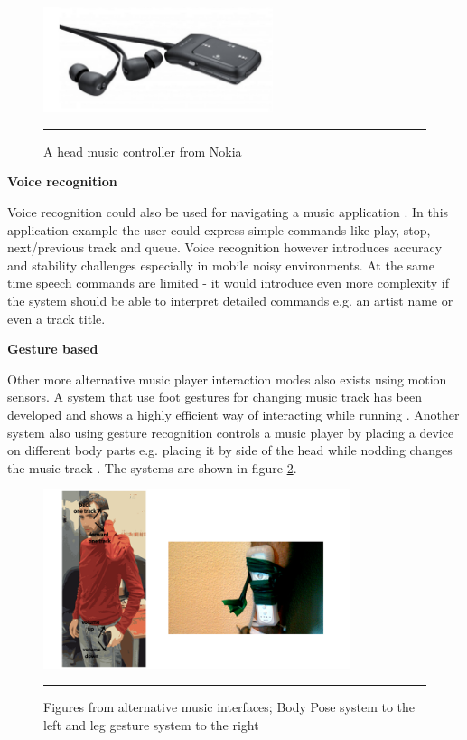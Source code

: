 \begin{figure}[t]
	\centering
		\includegraphics[width=0.6\textwidth,height=\textheight,keepaspectratio]{./Figures/nokia-headset.png}
		\rule{35em}{0.5pt}
	\caption[Nokia music headset]{A head music controller from Nokia \cite{nokia_launch:_2011}}
	\label{fig:nokia}
\end{figure}

\textbf{Voice recognition}

Voice recognition could also be used for navigating a music application \cite{stewart_boling_voice_2013}. In this application example the user could express simple commands like play, stop, next/previous track and queue. Voice recognition however introduces accuracy and stability challenges especially in mobile noisy environments. At the same time speech commands are limited - it would introduce even more complexity if the system should be able to interpret detailed commands e.g. an artist name or even a track title.


\textbf{Gesture based}

Other more alternative music player interaction modes also exists using motion sensors. A system that use foot gestures for changing music track has been developed and shows a highly efficient way of interacting while running \cite{smus_running_2010}. Another system also using gesture recognition controls a music player by placing a device on different body parts e.g. placing it by side of the head while nodding changes the music track \cite{strachan_bodyspace_2007}. The systems are shown in figure \ref{fig:bodyandleg}.

\begin{figure}[t]
	\centering
		\includegraphics[width=0.8\textwidth,height=\textheight,keepaspectratio]{./Figures/bodyposeandleg.png}
		\rule{35em}{0.5pt}
	\caption[Alternative music players]{Figures from alternative music interfaces; Body Pose system \cite{strachan_bodyspace_2007} to the left and leg gesture system \cite{smus_running_2010} to the right}
	\label{fig:bodyandleg}
\end{figure}


